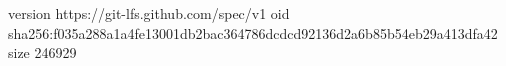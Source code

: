 version https://git-lfs.github.com/spec/v1
oid sha256:f035a288a1a4fe13001db2bac364786dcdcd92136d2a6b85b54eb29a413dfa42
size 246929
